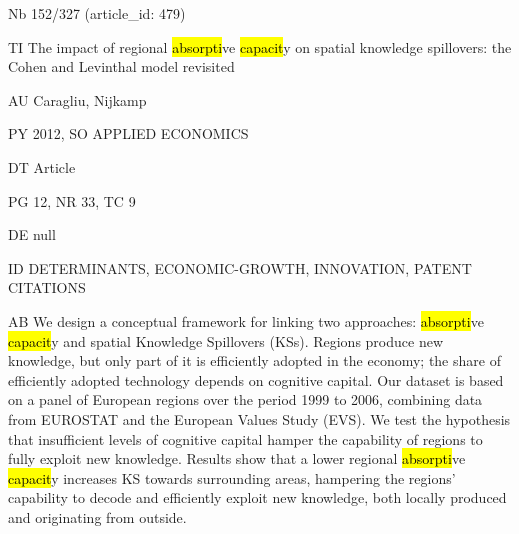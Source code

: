 \documentclass[a4paper]{article}
\begin{document}
\vspace*{-2cm}
Nb \tabto{0cm}152/327 (article\_id: 479)\par
TI \tabto{0cm}The impact of regional \hl{absorpti}ve \hl{capacit}y on spatial knowledge spillovers: the Cohen and Levinthal model revisited\par
AU \tabto{0cm}Caragliu, Nijkamp\par
PY \tabto{0cm}2012, SO APPLIED ECONOMICS\par
DT \tabto{0cm}Article\par
PG \tabto{0cm}12, NR 33, TC 9\par
DE \tabto{0cm}null\par
ID \tabto{0cm}DETERMINANTS, ECONOMIC-GROWTH, INNOVATION, PATENT CITATIONS\par
AB \tabto{0cm}We design a conceptual framework for linking two approaches: \hl{absorpti}ve \hl{capacit}y and spatial Knowledge Spillovers (KSs). Regions produce new knowledge, but only part of it is efficiently adopted in the economy; the share of efficiently adopted technology depends on cognitive capital. Our dataset is based on a panel of European regions over the period 1999 to 2006, combining data from EUROSTAT and the European Values Study (EVS). We test the hypothesis that insufficient levels of cognitive capital hamper the capability of regions to fully exploit new knowledge. Results show that a lower regional \hl{absorpti}ve \hl{capacit}y increases KS towards surrounding areas, hampering the regions' capability to decode and efficiently exploit new knowledge, both locally produced and originating from outside.\par
\clearpage
\end{document}
